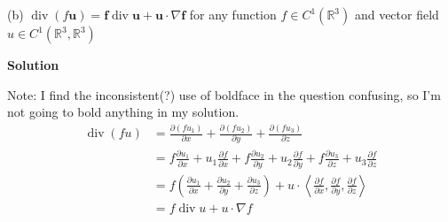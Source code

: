 \documentclass{article}
\begin{document}
\vspace{5mm}
(b) $\operatorname{div}(f \mathbf{u}) = \mathbf{f} \operatorname{div} \mathbf{u} + \mathbf{u} \cdot \nabla \mathbf{f}$
for any function $f \in C^{1}\left(\mathbb{R}^{3}\right)$ and vector field
$u \in C^{1}\left(\mathbb{R}^{3}, \mathbb{R}^{3}\right)$

\textbf{Solution}

Note: I find the inconsistent(?) use of boldface in the question
confusing, so I'm not going to bold anything in my solution.
%
\begin{align*}
    \operatorname{div}(f u)
        &= \frac{\partial (f u_1)}{\partial x}
           + \frac{\partial (f u_2)}{\partial y}
           + \frac{\partial (f u_3)}{\partial z}
           \\
        &= f \frac{\partial u_1}{\partial x} + u_1 \frac{\partial f}{\partial x}
           + f \frac{\partial u_2}{\partial y} + u_2 \frac{\partial f}{\partial y}
           + f \frac{\partial u_3}{\partial z} + u_3 \frac{\partial f}{\partial z}
           \\
        &= f \left(
            \frac{\partial u_1}{\partial x}
            + \frac{\partial u_2}{\partial y}
            + \frac{\partial u_3}{\partial z}
           \right) +
           u \cdot \left\langle
                \frac{\partial f}{\partial x},
                \frac{\partial f}{\partial y},
                \frac{\partial f}{\partial z}
           \right\rangle \\
        &= f \operatorname{div} u + u \cdot \nabla f
\end{align*}
\end{document}
